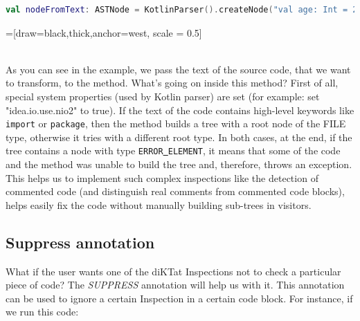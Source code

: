 \begin{lstlisting}[caption={Example of creating an AST from text of code.}, label={lst:example1}, language=Kotlin]
	val nodeFromText: ASTNode = KotlinParser().createNode("val age: Int = 21")
\end{lstlisting}

=[draw=black,thick,anchor=west, scale = 0.5]

\\

As you can see in the example, we pass the text of the source code, that we want to transform, to the method.  What's going on inside this method? First of all, special system properties (used by Kotlin parser) are set (for example: set "idea.io.use.nio2" to true). If the text of the code contains high-level keywords like \texttt{import} or \texttt{package}, then the method builds a tree with a root node of the FILE type, otherwise it tries with a different root type. In both cases, at the end, if the tree contains a node with type \texttt{ERROR\underline{ }ELEMENT}, it means that some of the code and the method was unable to build the tree and, therefore, throws an exception.\\
This helps us to implement such complex inspections like the detection of commented code (and distinguish real comments from commented code blocks), helps easily fix the code without manually building sub-trees in visitors.\\

\subsection{Suppress annotation}
\par
What if the user wants one of the diKTat Inspections not to check a particular piece of code? The \textsl{SUPPRESS} annotation will help us with it. This annotation can be used to ignore a certain Inspection in a certain code block. For instance, if we run this code:


